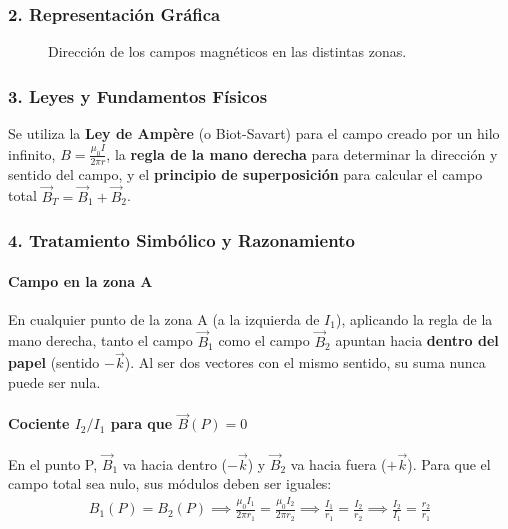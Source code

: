 \subsubsection*{2. Representación Gráfica}
\begin{figure}[H]
    \centering
    \caption{Dirección de los campos magnéticos en las distintas zonas.}
\end{figure}

\subsubsection*{3. Leyes y Fundamentos Físicos}
Se utiliza la \textbf{Ley de Ampère} (o Biot-Savart) para el campo creado por un hilo infinito, $B = \frac{\mu_0 I}{2\pi r}$, la \textbf{regla de la mano derecha} para determinar la dirección y sentido del campo, y el \textbf{principio de superposición} para calcular el campo total $\vec{B}_T = \vec{B}_1 + \vec{B}_2$.

\subsubsection*{4. Tratamiento Simbólico y Razonamiento}
\paragraph*{Campo en la zona A}
En cualquier punto de la zona A (a la izquierda de $I_1$), aplicando la regla de la mano derecha, tanto el campo $\vec{B}_1$ como el campo $\vec{B}_2$ apuntan hacia \textbf{dentro del papel} (sentido $-\vec{k}$). Al ser dos vectores con el mismo sentido, su suma nunca puede ser nula.

\paragraph*{Cociente $I_2/I_1$ para que $\vec{B}(P)=0$}
En el punto P, $\vec{B}_1$ va hacia dentro ($-\vec{k}$) y $\vec{B}_2$ va hacia fuera ($+\vec{k}$). Para que el campo total sea nulo, sus módulos deben ser iguales:
\begin{gather}
    B_1(P) = B_2(P) \implies \frac{\mu_0 I_1}{2\pi r_1} = \frac{\mu_0 I_2}{2\pi r_2} \implies \frac{I_1}{r_1} = \frac{I_2}{r_2} \implies \frac{I_2}{I_1} = \frac{r_2}{r_1}
\end{gather}

